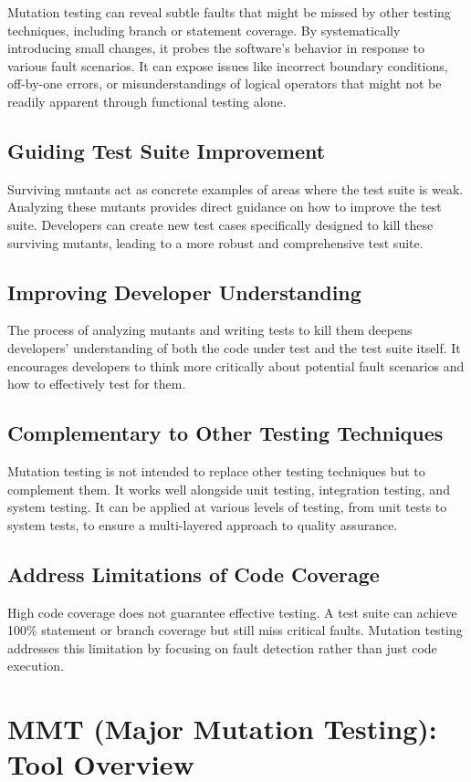 \documentclass[sigplan, nonacm]{acmart}
\begin{document}
Mutation testing can reveal subtle faults that might be missed by other testing techniques,
including branch or statement coverage. By systematically introducing small changes, it probes the
software's behavior in response to various fault scenarios.
It can expose issues like incorrect boundary conditions, off-by-one errors, or misunderstandings of
logical operators that might not be readily apparent through functional testing alone.
\subsection{Guiding Test Suite Improvement}

Surviving mutants act as concrete examples of areas where the test suite is weak. Analyzing these
mutants provides direct guidance on how to improve the test suite.
Developers can create new test cases specifically designed to kill these surviving mutants, leading
to a more robust and comprehensive test suite.
\subsection{Improving Developer Understanding}

The process of analyzing mutants and writing tests to kill them deepens developers' understanding
of both the code under test and the test suite itself.
It encourages developers to think more critically about potential fault scenarios and how to
effectively test for them.
\subsection{Complementary to Other Testing Techniques}

Mutation testing is not intended to replace other testing techniques but to complement them. It
works well alongside unit testing, integration testing, and system testing.
It can be applied at various levels of testing, from unit tests to system tests, to ensure a
multi-layered approach to quality assurance.
\subsection{Address Limitations of Code Coverage}

High code coverage does not guarantee effective testing. A test suite can achieve 100\% statement
or branch coverage but still miss critical faults. Mutation testing addresses this limitation by
focusing on fault detection rather than just code execution.
\section{MMT (Major Mutation Testing): Tool Overview}
\end{document}
